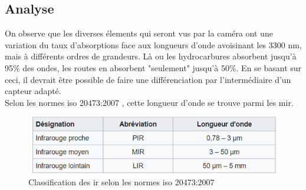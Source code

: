 \subsection{Analyse}
On observe que les diverses élements qui seront vus par la caméra ont une variation du taux d'absorptions face aux longueurs d'onde avoisinant les
3300 \si{\nano\metre}, mais à différents ordres de grandeurs. Là ou les hydrocarbures absorbent jusqu'à 95\% des ondes, les routes en absorbent "seulement" jusqu'à 50\%.
En se basant sur ceci, il devrait être possible de faire une différenciation par l'intermédiaire d'un capteur adapté.\\
Selon les normes \Gls{iso} 20473:2007 \cite{ISO}, cette longueur d'onde se trouve parmi les \Gls{mir}.\\
\begin{figure}[H]
    \centering
    \includegraphics[width=13cm]{assets/figures/gamme_infra.png}
    \caption{Classification des \Gls{ir} selon les normes \Gls{iso} 20473:2007 \cite{ISO}}
\end{figure}
